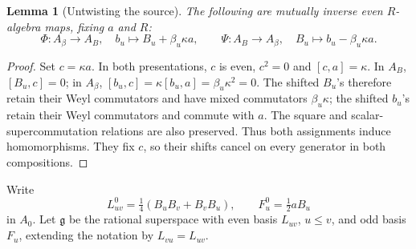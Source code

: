 \documentclass[11pt]{article}
\numberwithin{equation}{section}
\newtheorem{lemma}[theorem]{Lemma}
\theoremstyle{remark}
\begin{document}
\begin{lemma}[Untwisting the source]\label{lem:source-isomorphism}
The following are mutually inverse even $R$-algebra maps, fixing $a$ and
$R$:
\[
 \Phi:A_\beta\longrightarrow A_B,\quad b_u\longmapsto B_u+\beta_u\kappa a,
 \qquad
 \Psi:A_B\longrightarrow A_\beta,\quad B_u\longmapsto b_u-\beta_u\kappa a.
\]
\end{lemma}
\begin{proof}
Set $c=\kappa a$. In both presentations, $c$ is even,
$c^2=0$ and $[c,a]=\kappa$. In $A_B$, $[B_u,c]=0$; in
$A_\beta$, $[b_u,c]=\kappa[b_u,a]=\beta_u\kappa^2=0$.
The shifted $B_u$'s therefore retain their Weyl commutators and have mixed
commutators $\beta_u\kappa$; the shifted $b_u$'s retain their Weyl
commutators and commute with $a$. The square and scalar-supercommutation
relations are also preserved. Thus both assignments induce homomorphisms.
They fix $c$, so their shifts cancel on every generator in both compositions.
\end{proof}

Write
\[
 L^0_{uv}=\tfrac{1}{4}(B_uB_v+B_vB_u),\qquad F^0_u=\tfrac{1}{2}aB_u
\]
in $A_0$. Let $\mathfrak g$ be the rational superspace with even basis
$L_{uv}$, $u\leq v$, and odd basis $F_u$, extending the notation by
$L_{vu}=L_{uv}$.
\end{document}
